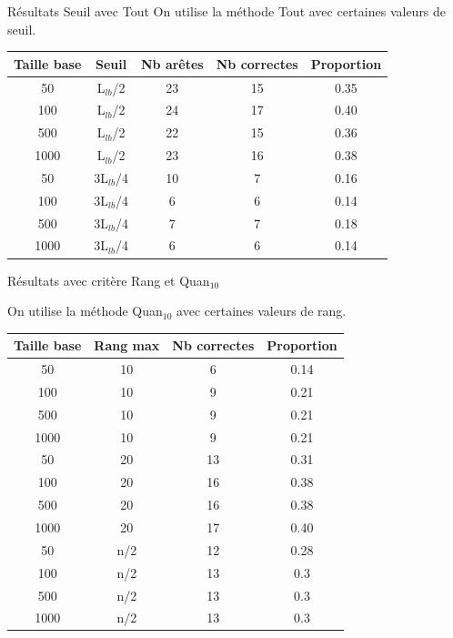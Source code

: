 \documentclass{beamer}
\begin{document}
\begin{frame}{Résultats Seuil avec Tout}
On utilise la méthode Tout avec certaines valeurs de seuil.
\begin{tabular}{|c|c|c|c|c|}
   \hline
   Taille base & Seuil & Nb arêtes & Nb correctes & Proportion\\
   \hline
   50 & L$_{lb}$/2 & 23 & 15 & 0.35  \\
   \hline
   100 & L$_{lb}$/2 & 24 & 17 & 0.40  \\
   \hline
   500 & L$_{lb}$/2 & 22 & 15 & 0.36  \\
   \hline
   1000 & L$_{lb}$/2 & 23 & 16 & 0.38  \\
   \hline
   \hline
   50 & 3L$_{lb}$/4 & 10 & 7 & 0.16  \\
   \hline
   100 & 3L$_{lb}$/4 & 6 & 6 & 0.14  \\
   \hline
   500 & 3L$_{lb}$/4 & 7 & 7 & 0.18  \\
   \hline
   1000 & 3L$_{lb}$/4 & 6 & 6 & 0.14  \\
   \hline
\end{tabular}
\end{frame}


\begin{frame}{Résultats avec critère Rang et Quan$_{10}$}

On utilise la méthode Quan$_{10}$ avec certaines valeurs de rang.
\begin{tabular}{|c|c|c|c|}
   \hline
   Taille base & Rang max & Nb correctes & Proportion\\
   \hline
   50 & 10  & 6 & 0.14  \\
   \hline
   100 & 10  & 9 & 0.21  \\
   \hline
   500 & 10  & 9 & 0.21  \\
   \hline
   1000 & 10 & 9 & 0.21  \\
   \hline
   \hline
   50 & 20 & 13 & 0.31  \\
   \hline
   100 & 20 & 16 & 0.38  \\
   \hline
   500 & 20 & 16 & 0.38  \\
   \hline
   1000 & 20 & 17 & 0.40  \\
   \hline
   50 & n/2 & 12 & 0.28  \\
   \hline
   100 & n/2 & 13 & 0.3  \\
   \hline
   500 & n/2 & 13 & 0.3  \\
   \hline
   1000 & n/2 & 13 & 0.3  \\
   \hline
\end{tabular}

\end{frame}
\end{document}
